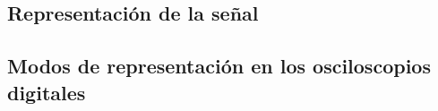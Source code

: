 


\subsection{Representación de la señal}




\subsection{Modos de representación en los osciloscopios digitales}\label{subsec:repmodes}

